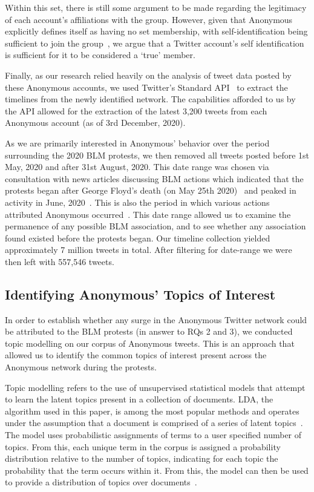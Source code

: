 \documentclass[letterpaper]{article}
\begin{document}
Within this set, there is still some argument to be made regarding the legitimacy of each account's affiliations with the group. However, given that Anonymous explicitly defines itself as having no set membership, with self-identification being sufficient to join the group~\cite{Olson2013}, we argue that a Twitter account's self identification is sufficient for it to be considered a `true' member.

Finally, as our research relied heavily on the analysis of tweet data posted by these Anonymous accounts, we used Twitter's Standard API~\cite{TwitterAPI} to extract the timelines from the newly identified network. The capabilities afforded to us by the API allowed for the extraction of the latest 3,200 tweets from each Anonymous account (as of 3rd December, 2020).

As we are primarily interested in Anonymous' behavior over the period surrounding the 2020 BLM protests, we then removed all tweets posted before 1st May, 2020 and after 31st August, 2020. This date range was chosen via consultation with news articles discussing BLM actions which indicated that the protests began after George Floyd's death (on May 25th 2020)~\cite{AlJazeera2020, Independant2020} and peaked in activity in June, 2020~\cite{NYT2020}. This is also the period in which various actions attributed Anonymous occurred~\cite{AJC2020}. This date range allowed us to examine the permanence of any possible BLM association, and to see whether any association found existed before the protests began. Our timeline collection yielded approximately 7 million tweets in total. After filtering for date-range we were then left with 557,546 tweets.

\subsection{Identifying Anonymous' Topics of Interest}

In order to establish whether any surge in the Anonymous Twitter network could be attributed to the BLM protests (in answer to RQs 2 and 3), we conducted topic modelling on our corpus of Anonymous tweets. This is an approach that allowed us to identify the common topics of interest present across the Anonymous network during the protests.

Topic modelling refers to the use of unsupervised statistical models that attempt to learn the latent topics present in a collection of documents. LDA, the algorithm used in this paper, is among the most popular methods and operates under the assumption that a document is comprised of a series of latent topics~\cite{Kigerl2018}. The model uses probabilistic assignments of terms to a user specified number of topics. From this, each unique term in the corpus is assigned a probability distribution relative to the number of topics, indicating for each topic the probability that the term occurs within it. From this, the model can then be used to provide a distribution of topics over documents~\cite{Kigerl2018}.
\end{document}
